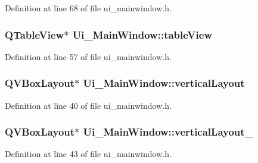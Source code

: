 Definition at line 68 of file ui\+\_\+mainwindow.\+h.

\hypertarget{class_ui___main_window_a3f4332a5b5e82f676f25ec3148c1c83c}{}
\subsubsection[{table\+View}]{\setlength{\rightskip}{0pt plus 5cm}Q\+Table\+View$\ast$ Ui\+\_\+\+Main\+Window\+::table\+View}\label{class_ui___main_window_a3f4332a5b5e82f676f25ec3148c1c83c}


Definition at line 57 of file ui\+\_\+mainwindow.\+h.

\hypertarget{class_ui___main_window_aecd96a04789fcfec3f98d80390ad8184}{}
\subsubsection[{vertical\+Layout}]{\setlength{\rightskip}{0pt plus 5cm}Q\+V\+Box\+Layout$\ast$ Ui\+\_\+\+Main\+Window\+::vertical\+Layout}\label{class_ui___main_window_aecd96a04789fcfec3f98d80390ad8184}


Definition at line 40 of file ui\+\_\+mainwindow.\+h.

\hypertarget{class_ui___main_window_a0c01bad60d9f422a1258e710635a2f65}{}
\subsubsection[{vertical\+Layout\+\_\+2}]{\setlength{\rightskip}{0pt plus 5cm}Q\+V\+Box\+Layout$\ast$ Ui\+\_\+\+Main\+Window\+::vertical\+Layout\+\_}\label{class_ui___main_window_a0c01bad60d9f422a1258e710635a2f65}


Definition at line 43 of file ui\+\_\+mainwindow.\+h.

\hypertarget{class_ui___main_window_a38b8a4b887f3b58e2a49e7905ae6f1f0}{}
